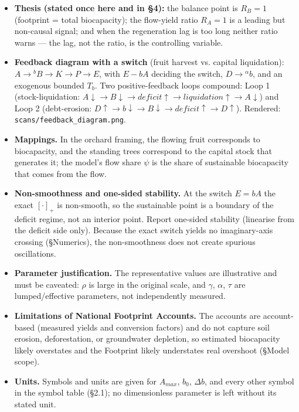 \documentclass[11pt]{article}
\begin{document}
\begin{itemize}
\item \textbf{Thesis (stated once here and in §4):} the balance point is $R_{B} = 1$ (footprint = total biocapacity); the flow-yield ratio $R_{A} = 1$ is a leading but non-causal signal; and when the regeneration lag is too long neither ratio warns — the lag, not the ratio, is the controlling variable.
\item \textbf{Feedback diagram with a switch} (fruit harvest vs. capital liquidation): $A \to{}^{b} B \to{} K \to{} P \to{} E$, with $E - bA$ deciding the switch, $D \to{}^{\alpha{}} b$, and an exogenous bounded $T_{b}$. Two positive-feedback loops compound: Loop 1 (stock-liquidation: $A\downarrow{} \to{} B\downarrow{} \to{} deficit\uparrow{} \to{} liquidation\uparrow{} \to{} A\downarrow{}$) and Loop 2 (debt-erosion: $D\uparrow{} \to{} b\downarrow{} \to{} B\downarrow{} \to{} deficit\uparrow{} \to{} D\uparrow{}$). Rendered: \texttt{scans/feedback\_diagram.png}.
\item \textbf{Mappings.} In the orchard framing, the flowing fruit corresponds to biocapacity, and the standing trees correspond to the capital stock that generates it; the model's flow share $\psi{}$ is the share of sustainable biocapacity that comes from the flow.
\item \textbf{Non-smoothness and one-sided stability.} At the switch $E = bA$ the exact $[\cdot{}]_{+}$ is non-smooth, so the sustainable point is a boundary of the deficit regime, not an interior point. Report one-sided stability (linearise from the deficit side only). Because the exact switch yields no imaginary-axis crossing (§Numerics), the non-smoothness does not create spurious oscillations.
\item \textbf{Parameter justification.} The representative values are illustrative and must be caveated: $\rho{}$ is large in the original scale, and $\gamma{}$, $\alpha{}$, $\tau{}$ are lumped/effective parameters, not independently measured.
\item \textbf{Limitations of National Footprint Accounts.} The accounts are account-based (measured yields and conversion factors) and do not capture soil erosion, deforestation, or groundwater depletion, so estimated biocapacity likely overstates and the Footprint likely understates real overshoot (§Model scope).
\item \textbf{Units.} Symbols and units are given for $A_{max}$, $b_{0}$, $\Delta{}b$, and every other symbol in the symbol table (§2.1); no dimensionless parameter is left without its stated unit.
\end{itemize}
\end{document}

